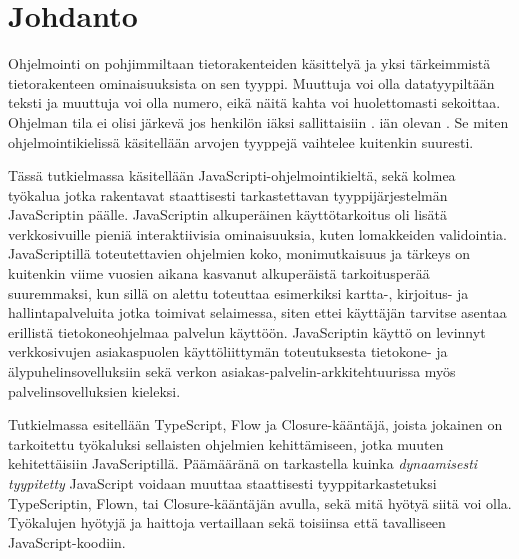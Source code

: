\chapter{Johdanto} \label{Johdanto}

Ohjelmointi on pohjimmiltaan tietorakenteiden käsittelyä ja yksi tärkeimmistä
tietorakenteen ominaisuuksista on sen tyyppi. Muuttuja  voi olla
datatyypiltään teksti ja muuttuja  voi olla numero, eikä näitä kahta voi
huolettomasti sekoittaa. Ohjelman tila ei olisi järkevä jos henkilön
iäksi sallittaisiin .
iän olevan . Se miten ohjelmointikielissä käsitellään arvojen tyyppejä
vaihtelee kuitenkin suuresti.

Tässä tutkielmassa käsitellään JavaScripti-ohjelmointikieltä,
sekä kolmea työkalua jotka rakentavat staattisesti tarkastettavan tyyppijärjestelmän
JavaScriptin päälle. JavaScriptin alkuperäinen käyttötarkoitus
oli lisätä verkkosivuille pieniä interaktiivisia ominaisuuksia,
kuten lomakkeiden validointia. JavaScriptillä
toteutettavien ohjelmien koko, monimutkaisuus ja tärkeys on kuitenkin viime
vuosien aikana kasvanut alkuperäistä tarkoitusperää suuremmaksi, kun sillä on
alettu toteuttaa esimerkiksi kartta-, kirjoitus- ja hallintapalveluita jotka
toimivat selaimessa, siten ettei käyttäjän tarvitse asentaa erillistä
tietokoneohjelmaa palvelun käyttöön.
JavaScriptin käyttö on levinnyt verkkosivujen asiakaspuolen käyttöliittymän
toteutuksesta tietokone- ja älypuhelinsovelluksiin sekä verkon
asiakas-palvelin-arkkitehtuurissa myös palvelinsovelluksien kieleksi.

Tutkielmassa esitellään TypeScript, Flow ja Closure-kääntäjä, joista jokainen on
tarkoitettu työkaluksi sellaisten ohjelmien kehittämiseen,
jotka muuten kehitettäisiin\newline
JavaScriptillä. Päämääränä on tarkastella kuinka \textit{dynaamisesti tyypitetty}
JavaScript voidaan muuttaa staattisesti tyyppitarkastetuksi
TypeScriptin, Flown, tai Closure-kääntäjän avulla, sekä mitä hyötyä siitä voi
olla. Työkalujen hyötyjä ja haittoja vertaillaan sekä toisiinsa että
tavalliseen JavaScript-koodiin.
